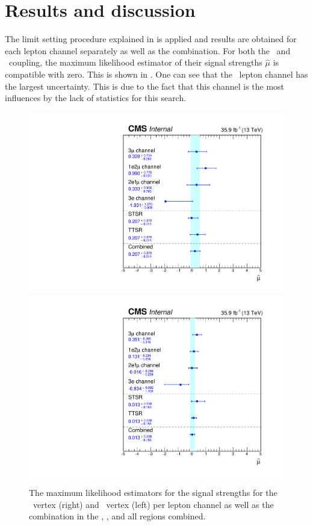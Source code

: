 \newpage
\section{Results and discussion}
\label{sec:Result}
The limit setting procedure explained in  is applied and results are obtained for each lepton channel separately as well as the combination. For both the \Zut\ and \Zct\ coupling, the maximum likelihood estimator of their signal strengths $\hat{\mu}$ is compatible with zero. This is shown in . One can see that the \eee\ lepton channel has the largest uncertainty. This is due to the fact that this channel is the most influences by the lack of statistics for this search.
\begin{figure}[htbp]
	\centering
	\includegraphics[width=0.49\linewidth]{6_Search/Figures/MLE/MLEZut.pdf}
	\includegraphics[width=0.49\linewidth]{6_Search/Figures/MLE/MLEZct.pdf}
	\caption{The maximum likelihood estimators for the signal strengths for the \Zut\ vertex (right) and \Zct\ vertex (left) per lepton channel as well as the combination in the \STSR, \TTSR, and all regions combined. }
	\label{fig:mlezut}
\end{figure}


